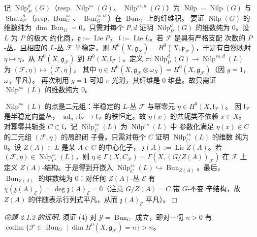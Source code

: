 记 $\operatorname{Nilp}_P^d(G)$（resp. $\operatorname{Nilp}^{ss}(G)$、
$\operatorname{Nilp}^{ss,d}(G)$）为
$\operatorname{Nilp}=\operatorname{Nilp}(G)$ 与
$\operatorname{Shatz}_P^d$（resp. $\operatorname{Bun}_G^{ss}$、
$\operatorname{Bun}_G^{ss,d}$）在 $\operatorname{Bun}_G$ 上的纤维积。
要证 $\operatorname{Nilp}(G)$ 的维数纯为
$\dim\operatorname{Bun}_G=0$，只需对每个 $P,d$ 证明
$\operatorname{Nilp}_P^d(G)$ 的维数纯为 $0$。设 $L$ 为 $P$ 的极大
约化商，$\mathfrak{p}:=\operatorname{Lie}P$，
$\mathfrak{l}:=\operatorname{Lie}L$。若 $\mathcal{F}$ 是具有严格支配
次数的 $P$-丛，且相应的 $L$-丛 $\overline{\mathcal{F}}$ 半稳定，则
$H^0(X,\mathfrak{g}_{\mathcal{F}})
=H^0(X,\mathfrak{p}_{\mathcal{F}})$，于是有自然映射
$\eta\mapsto\overline{\eta}$，从
$H^0(X,\mathfrak{g}_{\mathcal{F}})$ 到
$H^0(X,\mathfrak{l}_{\mathcal{F}})$。定义
$\pi:\operatorname{Nilp}_P^d(G)\to\operatorname{Nilp}^{ss,d}(L)$ 为
$(\mathcal{F},\eta)\mapsto(\overline{\mathcal{F}},\overline{\eta})$，
其中 $\eta\in H^0(X,\mathfrak{g}_{\mathcal{F}}\otimes\omega_X)
=H^0(X,\mathfrak{g}_{\mathcal{F}})$（因 $g=1$，$\omega_X$ 平凡）。
再次利用 $g=1$ 可知 $\pi$ 光滑，其纤维是 $0$ 维叠。故只需证
$\operatorname{Nilp}^{ss}(L)$ 的维数纯为 $0$。

$\operatorname{Nilp}^{ss}(L)$ 的点是二元组：半稳定的 $L$-丛
$\mathcal{F}$ 与幂零元 $\eta\in H^0(X,\mathfrak{l}_{\mathcal{F}})$。
因 $\mathfrak{l}_{\mathcal{F}}$ 是半稳定向量丛，
$\operatorname{ad}_\eta:\mathfrak{l}_{\mathcal{F}}\to
\mathfrak{l}_{\mathcal{F}}$ 的秩恒定。故 $\eta(x)$ 的共轭类不依赖
$x\in X$。对幂零共轭类 $C\subset\mathfrak{l}$，记
$\operatorname{Nilp}_C^{ss}(L)$ 为 $\operatorname{Nilp}^{ss}(L)$ 中
参数化满足 $\eta(x)\in C$ 的二元组 $(\mathcal{F},\eta)$ 的局部闭
子叠。只需对每个 $C$ 证明 $\operatorname{Nilp}_C^{ss}(L)$ 的维数
纯为 $0$。设 $Z(A)\subset L$ 是某 $A\in C$ 的中心化子，
$\mathfrak{z}(A):=\operatorname{Lie}Z(A)$。若
$(\mathcal{F},\eta)\in\operatorname{Nilp}_C^{ss}(L)$，则
$\eta\in\Gamma(X,C_{\mathcal{F}})
=\Gamma(X,(G/Z(A))_{\mathcal{F}})$ 在 $\mathcal{F}$ 上定义
$Z(A)$-结构。于是得到开嵌入
$\operatorname{Nilp}_C^{ss}(L)
\hookrightarrow\operatorname{Bun}_{Z(A)}$。最后，
$\operatorname{Bun}_{Z(A)}$ 的维数纯为 $0$：对任何 $Z(A)$-丛
$\mathcal{E}$ 有 $\chi(\mathfrak{z}(A)_{\mathcal{E}})
=\deg\mathfrak{z}(A)_{\mathcal{E}}=0$（注意 $G/Z(A)=C$ 带 $G$-不变
辛结构，故 $Z(A)$ 的伴随表示行列式平凡，从而
$\mathfrak{z}(A)_{\mathcal{E}}$ 平凡）。\hfill$\Box$

 \emph{命题 2.1.2 的证明.} 须证 (4) 对
$\mathcal{Y}=\operatorname{Bun}_G$ 成立，即对一切 $n>0$ 有
$\operatorname{codim}\{\mathcal{F}\in\operatorname{Bun}_G\mid
\dim H^0(X,\mathfrak{g}_{\mathcal{F}})=n\}>n$。

